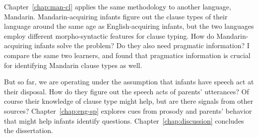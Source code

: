 Chapter~\ref{chap:man-cl} applies the same methodology to another language, Mandarin. Mandarin-acquiring infants figure out the clause types of their language around the same age as English-acquiring infants, but the two languages employ different morpho-syntactic features for clause typing. How do Mandarin-acquiring infants solve the problem? Do they also need pragmatic information? I compare the same two learners, and found that pragmatics information is crucial for identifying Mandarin clause types as well.

But so far, we are operating under the assumption that infants have speech act at their disposal. How do they figure out the speech acts of parents' utterances? Of course their knowledge of clause type might help, but are there signals from other sources? Chapter~\ref{chap:eng-sp} explores cues from prosody and parents' behavior that might help infants identify questions. Chapter~\ref{chap:discussion} concludes the dissertation.
 
